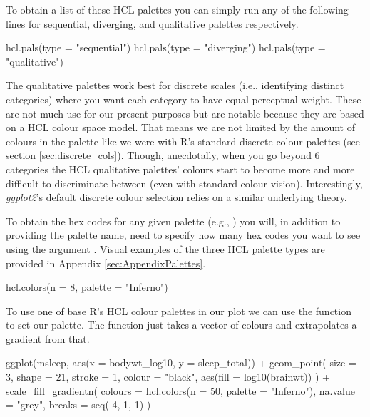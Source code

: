 To obtain a list of these HCL palettes you can simply run any of the following lines for sequential, diverging, and qualitative palettes respectively.

\begin{inR}
hcl.pals(type = "sequential")
hcl.pals(type = "diverging")
hcl.pals(type = "qualitative")
\end{inR}

\vspace{1em}

The qualitative palettes work best for discrete scales (i.e., identifying distinct categories) where you want each category to have equal perceptual weight. These are not much use for our present purposes but are notable because they are based on a HCL colour space model. That means we are not limited by the amount of colours in the palette like we were with R's standard discrete colour palettes (see section \ref{sec:discrete_cols}). Though, anecdotally, when you go beyond 6 categories the HCL qualitative palettes' colours start to become more and more difficult to discriminate between (even with standard colour vision). Interestingly, \textit{ggplot2}'s default discrete colour selection relies on a similar underlying theory.

To obtain the hex codes for any given palette (e.g., ) you will, in addition to providing the palette name, need to specify how many hex codes you want to see using the argument . Visual examples of the three HCL palette types are provided in Appendix \ref{sec:AppendixPalettes}.

\begin{inR}
hcl.colors(n = 8, palette = "Inferno") 
\end{inR}

To use one of base R's HCL colour palettes in our plot we can use the function \\  to set our palette. The function just takes a vector of colours and extrapolates a gradient from that.

\begin{inR}
ggplot(msleep, aes(x = bodywt_log10, y = sleep_total)) +
  geom_point(
    size = 3, shape = 21, stroke = 1, colour = "black",
    aes(fill = log10(brainwt))
  ) +
  scale_fill_gradientn(
    colours = hcl.colors(n = 50, palette = "Inferno"),
    na.value = "grey", 
    breaks = seq(-4, 1, 1)
  )
\end{inR}

